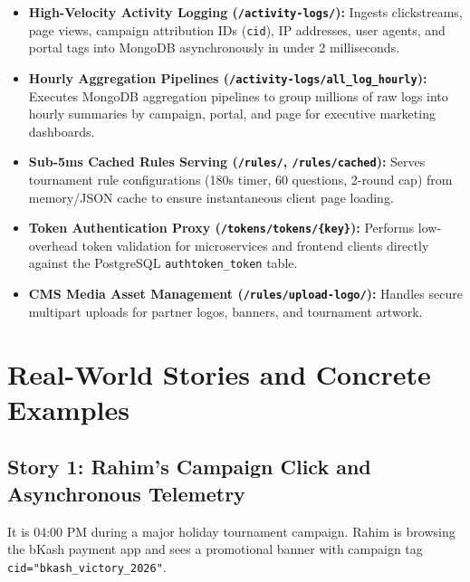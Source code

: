 \begin{itemize}
    \item \textbf{High-Velocity Activity Logging (\texttt{/activity-logs/}):} Ingests clickstreams, page views, campaign attribution IDs (\texttt{cid}), IP addresses, user agents, and portal tags into MongoDB asynchronously in under 2 milliseconds.
    \item \textbf{Hourly Aggregation Pipelines (\texttt{/activity-logs/all\_log\_hourly}):} Executes MongoDB aggregation pipelines to group millions of raw logs into hourly summaries by campaign, portal, and page for executive marketing dashboards.
    \item \textbf{Sub-5ms Cached Rules Serving (\texttt{/rules/}, \texttt{/rules/cached}):} Serves tournament rule configurations (180s timer, 60 questions, 2-round cap) from memory/JSON cache to ensure instantaneous client page loading.
    \item \textbf{Token Authentication Proxy (\texttt{/tokens/tokens/\{key\}}):} Performs low-overhead token validation for microservices and frontend clients directly against the PostgreSQL \texttt{authtoken\_token} table.
    \item \textbf{CMS Media Asset Management (\texttt{/rules/upload-logo/}):} Handles secure multipart uploads for partner logos, banners, and tournament artwork.
\end{itemize}

\section{Real-World Stories and Concrete Examples}

\subsection{Story 1: Rahim's Campaign Click and Asynchronous Telemetry}
It is 04:00 PM during a major holiday tournament campaign. Rahim is browsing the bKash payment app and sees a promotional banner with campaign tag \texttt{cid="bkash\_victory\_2026"}. 

